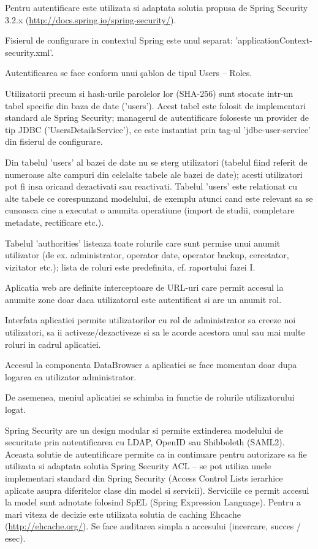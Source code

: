 
\medskip

Pentru autentificare este utilizata si adaptata solutia propusa de Spring Security 3.2.x (\url{http://docs.spring.io/spring-security/}).

Fisierul de configurare in contextul Spring este unul separat: 'applicationContext-security.xml'. 

\medskip

Autentificarea se face conform unui \c{s}ablon de tipul Users -- Roles.

Utilizatorii precum si hash-urile parolelor lor (SHA-256) sunt stocate intr-un tabel specific din baza de date ('users').
Acest tabel este folosit de implementari standard ale Spring Security; 
managerul de autentificare foloseste un provider de tip JDBC ('UsersDetailsService'), 
ce este instantiat prin tag-ul 'jdbc-user-service' din fisierul de configurare. 

Din tabelul 'users' al bazei de date nu se sterg utilizatori (tabelul fiind referit de numeroase alte campuri din celelalte tabele ale bazei de date); 
acesti utilizatori pot fi insa oricand dezactivati sau reactivati.
Tabelul 'users' este relationat cu alte tabele ce corespunzand modelului, 
de exemplu atunci cand este relevant sa se cunoasca cine a executat o anumita operatiune (import de studii, completare metadate, rectificare etc.).

Tabelul 'authorities' listeaza toate rolurile care sunt permise unui anumit utilizator (de ex. administrator, operator date, operator backup, cercetator, vizitator etc.); 
lista de roluri este predefinita, cf. raportului fazei I.

\medskip

Aplicatia web are definite interceptoare de URL-uri care permit accesul la anumite zone doar daca utilizatorul este autentificat si are un anumit rol.

Interfata aplicatiei permite utilizatorilor cu rol de administrator sa creeze noi utilizatori, sa ii activeze/dezactiveze si sa le acorde acestora unul sau mai multe roluri in cadrul aplicatiei.

Accesul la componenta DataBrowser a aplicatiei se face momentan doar dupa logarea ca utilizator administrator.

De asemenea, meniul aplicatiei se schimba in functie de rolurile utilizatorului logat.

\medskip

Spring Security are un design modular si permite extinderea modelului de securitate prin autentificarea cu LDAP, OpenID sau Shibboleth (SAML2).
Aceasta solutie de autentificare permite ca in continuare pentru autorizare sa fie utilizata si adaptata solutia Spring Security ACL --
se pot utiliza unele implementari standard din Spring Security (Access Control Lists ierarhice aplicate asupra diferitelor clase din model si servicii). 
Serviciile ce permit accesul la model sunt adnotate folosind SpEL
(Spring Expression Language).
Pentru a mari viteza de decizie este utilizata solutia de caching Ehcache (\url{http://ehcache.org/}). 
Se face auditarea simpla a accesului (incercare, succes / esec). 
